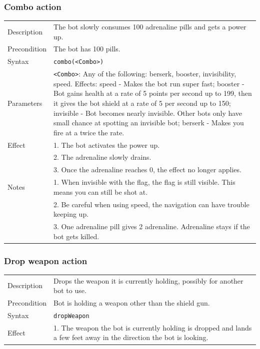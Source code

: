 \documentclass[11pt,a4paper]{article}
\begin{document}
\subsubsection*{Combo action}
%
\begin{small}
\begin{tabular}{p{2cm}p{9cm}}
Description & The bot slowly consumes 100 adrenaline pills and gets a power up.\\
Precondition & The bot has 100 pills.\\
Syntax & \verb|combo(<Combo>)|\\
Parameters & \verb|<Combo>|: Any of the following: berserk, booster, invisibility, speed.  Effects: speed - Makes the bot run super fast; booster - Bot gains health at a rate of 5 points per second up to 199, then it gives the bot shield at a rate of 5 per second up to 150; invisible - Bot becomes nearly invisible. Other bots only have small chance at spotting an invisible bot; berserk - Makes you fire at a twice the rate. \\
Effect & 
	1.	The bot activates the power up.\\
&	2.	The adrenaline slowly drains.\\
&	3.	Once the adrenaline reaches 0, the effect no longer applies.\\
Notes &
	1.	When invisible with the flag, the flag is still visible. This means you can still be shot at.\\
&	2.	Be careful when using speed, the navigation can have trouble keeping up.\\
& 3. One adrenaline pill gives 2 adrenaline. Adrenaline stays if the bot gets killed.
\end{tabular}
\end{small}


\subsubsection*{Drop weapon action}
\begin{small}
\begin{tabular}{p{2cm}p{9cm}}
Description & Drops the weapon it is currently holding, possibly for another bot to use.\\
Precondition & Bot is holding a weapon other than the shield gun.\\
Syntax & \verb|dropWeapon|\\
Effect & 
	1.	The weapon the bot is currently holding is dropped and lands a few feet away in the direction the bot is looking.
\end{tabular}
\end{small}
\end{document}
